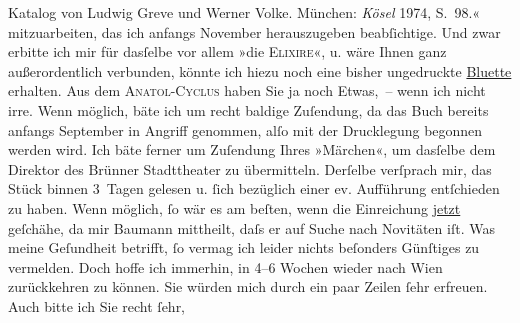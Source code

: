 \begin{ledgroupsized}[t]{13cm}
{{{                     Katalog von Ludwig Greve und Werner Volke. München:
                        \emph{Kösel}{ }1974, S. 98.}}}\label{K_L00037_1h}« mitzuarbeiten, das ich anfangs
                  November herauszugeben beabſichtige. Und zwar erbitte ich mir für
               dasſelbe vor allem »die \textsc{Elixire}«, u. wäre Ihnen ganz außerordentlich verbunden, könnte ich hiezu noch eine
               bisher ungedruckte \uline{Bluette} erhalten. Aus dem \textsc{Anatol-Cyclus} haben Sie ja noch Etwas, – wenn ich nicht irre. Wenn möglich, bäte ich um recht
               baldige Zuſendung, da das Buch bereits anfangs September in Angriff genommen, alſo
               mit der Drucklegung begonnen werden wird.\pend
           \pstart
           Ich bäte ferner um Zuſendung Ihres »Märchen«, um
               dasſelbe dem Direktor des
               Brünner Stadttheater zu übermit{\pb}teln. Derſelbe verſprach mir, das Stück binnen 3 Tagen
               gelesen u. ſich bezüglich einer ev. Aufführung entſchieden zu haben. Wenn möglich, ſo
               wär es am beſten, wenn die Einreichung \uline{jetzt}
               geſchähe, da mir Baumann mittheilt, daſs er auf
               Suche \introOben{}nach Novitäten\introOben{} iſt.\pend
           \pstart
           Was meine Geſundheit betrifft, ſo vermag ich leider nichts beſonders Günſtiges zu
               vermelden. Doch hoffe ich immerhin, in 4–6 Wochen wieder nach Wien zurückkehren zu können.\pend
           \pstart
           Sie würden mich durch ein paar Zeilen ſehr erfreuen. Auch bitte ich Sie recht ſehr,

\end{ledgroupsized}
